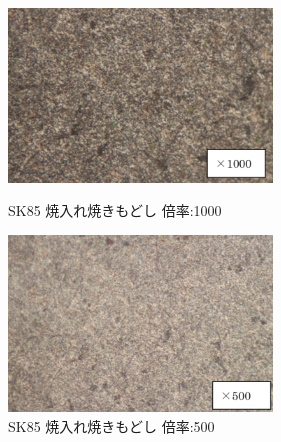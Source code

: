 \documentclass[10pt,a4j]{jsarticle}
\begin{document}
  \begin{figure}[htbp]
    \begin{minipage}{0.5\hsize}
      \begin{center}
        \includegraphics[width=7cm]{../img/SK85_yakiiremodoshi_1000.png}
        \caption{SK85 焼入れ焼きもどし 倍率:1000}
      \end{center}
    \end{minipage}
    \begin{minipage}{0.5\hsize}
      \begin{center}
        \includegraphics[width=7cm]{../img/SK85_yakiiremodoshi_500.png}
        \caption{SK85 焼入れ焼きもどし 倍率:500}
      \end{center}
    \end{minipage}
  \end{figure}
\end{document}
